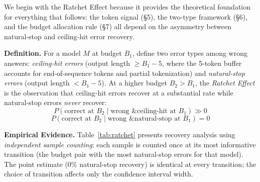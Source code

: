 \documentclass{article}
\begin{document}
We begin with the Ratchet Effect because it provides the theoretical foundation for everything that follows: the token signal (\S5), the two-type framework (\S6), and the budget allocation rule (\S7) all depend on the asymmetry between natural-stop and ceiling-hit error recovery.

\textbf{Definition.}
For a model $M$ at budget $B_1$, define two error types among wrong answers: \emph{ceiling-hit errors} (output length $\geq B_1 - 5$, where the 5-token buffer accounts for end-of-sequence tokens and partial tokenization) and \emph{natural-stop errors} (output length $< B_1 - 5$). At a higher budget $B_2 > B_1$, the \emph{Ratchet Effect} is the observation that ceiling-hit errors recover at a substantial rate while natural-stop errors \emph{never} recover:
$$P(\text{correct at } B_2 \mid \text{wrong \& ceiling-hit at } B_1) \gg 0$$
$$P(\text{correct at } B_2 \mid \text{wrong \& natural-stop at } B_1) = 0$$

\textbf{Empirical Evidence.}
Table~\ref{tab:ratchet} presents recovery analysis using \emph{independent sample counting}: each sample is counted once at its most informative transition (the budget pair with the most natural-stop errors for that model). The point estimate (0\% natural-stop recovery) is identical at every transition; the choice of transition affects only the confidence interval width.
\end{document}
